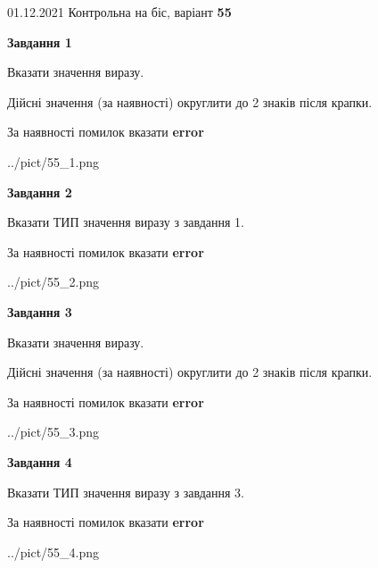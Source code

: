 \documentclass[11pt, ukrainian]{article}
\begin{document}
{01.12.2021 Контрольна на біс, варіант  \No \textbf { 55 }\par}
{
\begin {large}
{\begin {center}\textbf{Завдання 1}\end {center}}\par
Вказати значення виразу. \par
Дійсні значення (за наявності) округлити до 2 знаків після крапки. \par
За наявності помилок вказати \textbf{error}

\begin{center}
	{../pict/55_1.png}
\end{center}
\newpage

{\begin {center}\textbf{Завдання 2}\end {center}}\par
Вказати ТИП значення виразу з завдання 1. \par
За наявності помилок вказати \textbf{error}

\begin{center}
	{../pict/55_2.png}
\end{center}
\newpage

{\begin {center}\textbf{Завдання 3}\end {center}}\par
Вказати значення виразу. \par
Дійсні значення (за наявності) округлити до 2 знаків після крапки. \par
За наявності помилок вказати \textbf{error}

\begin{center}
	{../pict/55_3.png}
\end{center}
\newpage

{\begin {center}\textbf{Завдання 4}\end {center}}\par
Вказати ТИП значення виразу з завдання 3. \par
За наявності помилок вказати \textbf{error}

\begin{center}
	{../pict/55_4.png}
\end{center}
\newpage


\end{large}}
\end{document}
